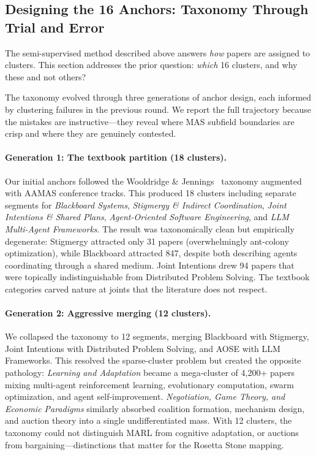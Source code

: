 \documentclass{article}
\begin{document}
\subsection{Designing the 16 Anchors: Taxonomy Through Trial and Error}
\label{sec:meth-anchors}

The semi-supervised method described above answers \emph{how} papers are assigned to
clusters. This section addresses the prior question: \emph{which} 16 clusters, and why
these and not others?

The taxonomy evolved through three generations of anchor design, each informed by
clustering failures in the previous round. We report the full trajectory because the
mistakes are instructive---they reveal where MAS subfield boundaries are crisp and
where they are genuinely contested.

\paragraph{Generation 1: The textbook partition (18 clusters).}
Our initial anchors followed the Wooldridge \& Jennings~\citep{wooldridge1995intelligent}
taxonomy augmented with AAMAS conference tracks. This produced 18 clusters including
separate segments for \emph{Blackboard Systems}, \emph{Stigmergy \& Indirect
Coordination}, \emph{Joint Intentions \& Shared Plans}, \emph{Agent-Oriented Software
Engineering}, and \emph{LLM Multi-Agent Frameworks}. The result was taxonomically clean
but empirically degenerate: Stigmergy attracted only 31 papers (overwhelmingly
ant-colony optimization), while Blackboard attracted 847, despite both describing
agents coordinating through a shared medium. Joint Intentions drew 94 papers that were
topically indistinguishable from Distributed Problem Solving. The textbook categories
carved nature at joints that the literature does not respect.

\paragraph{Generation 2: Aggressive merging (12 clusters).}
We collapsed the taxonomy to 12 segments, merging Blackboard with Stigmergy,
Joint Intentions with Distributed Problem Solving, and AOSE with LLM Frameworks.
This resolved the sparse-cluster problem but created the opposite pathology:
\emph{Learning and Adaptation} became a mega-cluster of 4,200+ papers mixing
multi-agent reinforcement learning, evolutionary computation, swarm optimization,
and agent self-improvement. \emph{Negotiation, Game Theory, and Economic Paradigms}
similarly absorbed coalition formation, mechanism design, and auction theory into a
single undifferentiated mass. With 12 clusters, the taxonomy could not distinguish
MARL from cognitive adaptation, or auctions from bargaining---distinctions that matter
for the Rosetta Stone mapping.
\end{document}
